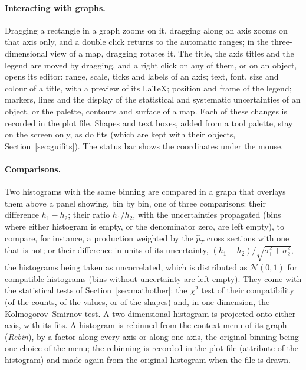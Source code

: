 \paragraph{Interacting with graphs.}
Dragging a rectangle in a graph zooms on it, dragging along an axis zooms on that axis only, and a double click
returns to the automatic ranges; in the three-dimensional view of a map, dragging rotates it. The title, the axis
titles and the legend are moved by dragging, and a right click on any of them, or on an object, opens its editor:
range, scale, ticks and labels of an axis; text, font, size and colour of a title, with a preview of its \LaTeX{};
position and frame of the legend; markers, lines and the display of the statistical and systematic uncertainties of
an object, or the palette, contours and surface of a map. Each of these changes is recorded in the plot file. Shapes
and text boxes, added from a tool palette, stay on the screen only, as do fits (which are kept with their objects,
Section~\ref{sec:guifits}). The status bar shows the coordinates under the mouse.

\paragraph{Comparisons.}
Two histograms with the same binning are compared in a graph that overlays them above a panel showing, bin by bin,
one of three comparisons: their difference $h_1 - h_2$; their ratio $h_1/h_2$, with the uncertainties propagated
(bins where either histogram is empty, or the denominator zero, are left empty), to compare, for instance, a
production weighted by the $\hat{p}_T$ cross sections with one that is not; or their difference in units of its
uncertainty, $(h_1 - h_2)/\sqrt{\sigma_1^2+\sigma_2^2}$, the histograms being taken as uncorrelated, which is
distributed as $\mathcal{N}(0,1)$ for compatible histograms (bins without uncertainty are left empty). They come with
the statistical tests of Section~\ref{sec:mathother}: the $\chi^2$ test of their
compatibility (of the counts, of the values, or of the shapes) and, in one dimension, the Kolmogorov--Smirnov test.
A two-dimensional histogram is projected onto either axis, with its fits. A histogram is rebinned from the context menu of its graph (\emph{Rebin}), by a factor along
every axis or along one axis, the original binning being one choice of the menu; the rebinning is recorded in the plot
file (attribute  of the histogram) and made again from the original histogram when the file is drawn.

